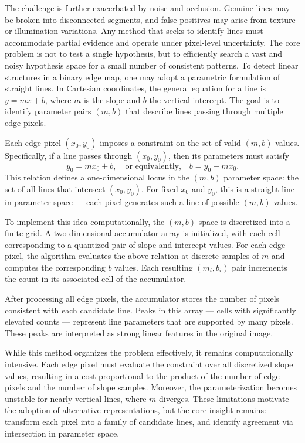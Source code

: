 The challenge is further exacerbated by noise and occlusion. Genuine lines may be broken into disconnected segments, and false positives may arise from texture or illumination variations. Any method that seeks to identify lines must accommodate partial evidence and operate under pixel-level uncertainty. The core problem is not to test a single hypothesis, but to efficiently search a vast and noisy hypothesis space for a small number of consistent patterns.
To detect linear structures in a binary edge map, one may adopt a parametric formulation of straight lines. In Cartesian coordinates, the general equation for a line is $y = mx + b$, where $m$ is the slope and $b$ the vertical intercept. The goal is to identify parameter pairs $(m, b)$ that describe lines passing through multiple edge pixels.

Each edge pixel $(x_0, y_0)$ imposes a constraint on the set of valid $(m, b)$ values. Specifically, if a line passes through $(x_0, y_0)$, then its parameters must satisfy
\[
y_0 = m x_0 + b,
\quad \text{or equivalently,} \quad
b = y_0 - m x_0.
\]
This relation defines a one-dimensional locus in the $(m, b)$ parameter space: the set of all lines that intersect $(x_0, y_0)$. For fixed $x_0$ and $y_0$, this is a straight line in parameter space — each pixel generates such a line of possible $(m, b)$ values.

To implement this idea computationally, the $(m, b)$ space is discretized into a finite grid. A two-dimensional accumulator array is initialized, with each cell corresponding to a quantized pair of slope and intercept values. For each edge pixel, the algorithm evaluates the above relation at discrete samples of $m$ and computes the corresponding $b$ values. Each resulting $(m_i, b_i)$ pair increments the count in its associated cell of the accumulator.

After processing all edge pixels, the accumulator stores the number of pixels consistent with each candidate line. Peaks in this array — cells with significantly elevated counts — represent line parameters that are supported by many pixels. These peaks are interpreted as strong linear features in the original image.

While this method organizes the problem effectively, it remains computationally intensive. Each edge pixel must evaluate the constraint over all discretized slope values, resulting in a cost proportional to the product of the number of edge pixels and the number of slope samples. Moreover, the parameterization becomes unstable for nearly vertical lines, where $m$ diverges. These limitations motivate the adoption of alternative representations, but the core insight remains: transform each pixel into a family of candidate lines, and identify agreement via intersection in parameter space.

